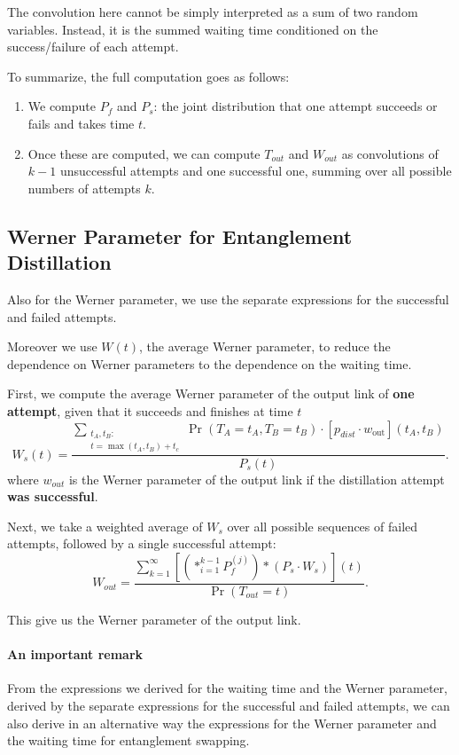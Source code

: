 \documentclass{masterthesis}
\begin{document}
The convolution here cannot be simply interpreted as a sum of two random variables. Instead, it is the summed waiting time conditioned on the success/failure of each attempt.

To summarize, the full computation goes as follows:
\begin{enumerate}
    \item We compute $P_f$ and $P_s$: the joint distribution that one attempt succeeds or fails and takes time $t$.
    \item Once these are computed, we can compute $T_{out}$ and $W_{out}$ as convolutions of $k-1$ unsuccessful attempts and one successful one, summing over all possible numbers of attempts $k$.
\end{enumerate}

\subsection*{Werner Parameter for Entanglement Distillation}

Also for the Werner parameter, we use the separate expressions for the successful and failed attempts. 

Moreover we use $W(t)$, the average Werner parameter, to reduce the dependence on Werner parameters to the dependence on the waiting time.

First, we compute the average Werner parameter of the output link of \textbf{one attempt}, given that it succeeds and finishes at time $t$
\begin{equation}
    W_s(t) = \frac{\sum_{\substack{t_A, t_B : \\ t = \max(t_A, t_B) + t_c}} \Pr(T_A = t_A, T_B = t_B) \cdot [p_{dist} \cdot w_{\text{out}}](t_A, t_B)}{P_s(t)}.
\end{equation}
where $w_{out}$ is the Werner parameter of the output link if the distillation attempt \textbf{was successful}.

Next, we take a weighted average of $W_s$ over all possible sequences of failed attempts, followed by a single successful attempt:
\begin{equation}\label{eq:werner_parameter_distillation}
    W_{out} = \frac{\sum_{k=1}^{\infty} \left[ \left( \ast_{i=1}^{k-1} P_f^{(j)} \right) \ast (P_s \cdot W_s) \right] (t)}{\Pr(T_{out} = t)}.
\end{equation}

This give us the Werner parameter of the output link.

\paragraph*{An important remark} From the expressions we derived for the waiting time and the Werner parameter, derived by the separate expressions for the successful and failed attempts, we can also derive in an alternative way the expressions for the Werner parameter and the waiting time for entanglement swapping.
\end{document}
